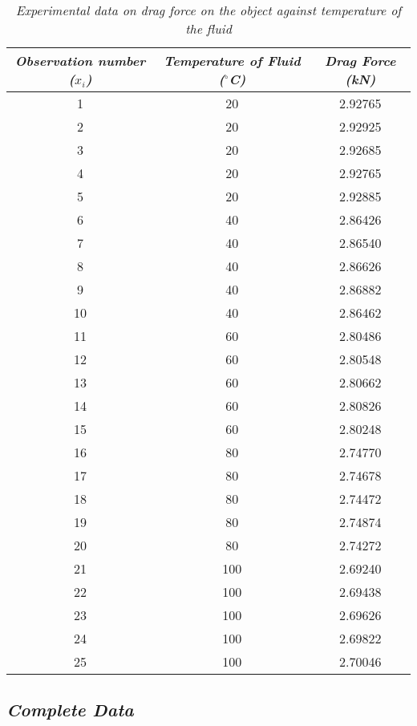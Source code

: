 	\begin{table}[H]
		\centering
		\begin{tabular}{|c|c|c|}
			\hline
			\hline
			\textit{Observation number ($x_i$)} & \textit{Temperature of Fluid ($^\circ$C)} & \textit{Drag Force (kN)} \\
			\hline
			\hline
			1 & 20 & 2.92765 \\
			\hline
			2 & 20 & 2.92925 \\
			\hline
			3 & 20 & 2.92685 \\
			\hline
			4 & 20 & 2.92765 \\
			\hline
			5 & 20 & 2.92885 \\
			\hline
			6 & 40 & 2.86426 \\
			\hline
			7 & 40 & 2.86540 \\
			\hline
			8 & 40 & 2.86626 \\
			\hline
			9 & 40 & 2.86882 \\
			\hline
			10 & 40 & 2.86462 \\
			\hline
			11 & 60 & 2.80486 \\
			\hline
			12 & 60 & 2.80548 \\
			\hline
			13 & 60 & 2.80662 \\
			\hline
			14 & 60 & 2.80826 \\
			\hline
			15 & 60 & 2.80248 \\
			\hline
			16 & 80 & 2.74770 \\
			\hline
			17 & 80 & 2.74678 \\
			\hline
			18 & 80 & 2.74472 \\
			\hline
			19 & 80 & 2.74874 \\
			\hline
			20 & 80 & 2.74272 \\
			\hline
			21 & 100 & 2.69240 \\
			\hline
			22 & 100 & 2.69438 \\
			\hline
			23 & 100 & 2.69626 \\
			\hline
			24 & 100 & 2.69822 \\
			\hline
			25 & 100 & 2.70046 \\
			\hline
			\hline
		\end{tabular}
		\caption{\textit{Experimental data on drag force on the object against temperature of the fluid}}
		\label{expdat}
	\end{table}

\subsection{\textit{Complete Data}}

